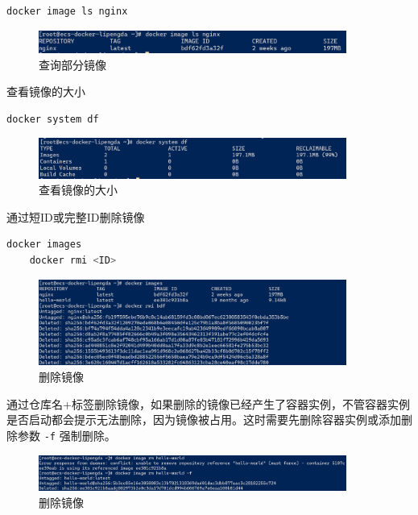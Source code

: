 \documentclass{article}
\begin{document}
\begin{lstlisting}[language=bash]
    docker image ls nginx
\end{lstlisting}

\begin{figure}[H]
\centering
\includegraphics[width=0.9\textwidth]{img/0.2.3.2.2.png}
\caption{查询部分镜像}
\end{figure}

查看镜像的大小

\begin{lstlisting}[language=bash]
    docker system df
\end{lstlisting}

\begin{figure}[H]
\centering
\includegraphics[width=0.9\textwidth]{img/0.2.3.2.3.png}
\caption{查看镜像的大小}
\end{figure}

通过短ID或完整ID删除镜像

\begin{lstlisting}[language=bash]
    docker images
    docker rmi <ID>
\end{lstlisting}

\begin{figure}[H]
\centering
\includegraphics[width=0.9\textwidth]{img/0.2.3.2.4.png}
\caption{删除镜像}
\end{figure}

通过仓库名+标签删除镜像，如果删除的镜像已经产生了容器实例，不管容器实例是否启动都会提示无法删除，因为镜像被占用。这时需要先删除容器实例或添加删除参数 \texttt{-f} 强制删除。

\begin{figure}[H]
\centering
\includegraphics[width=0.9\textwidth]{img/0.2.3.2.5.png}
\caption{删除镜像}
\end{figure}
\end{document}
